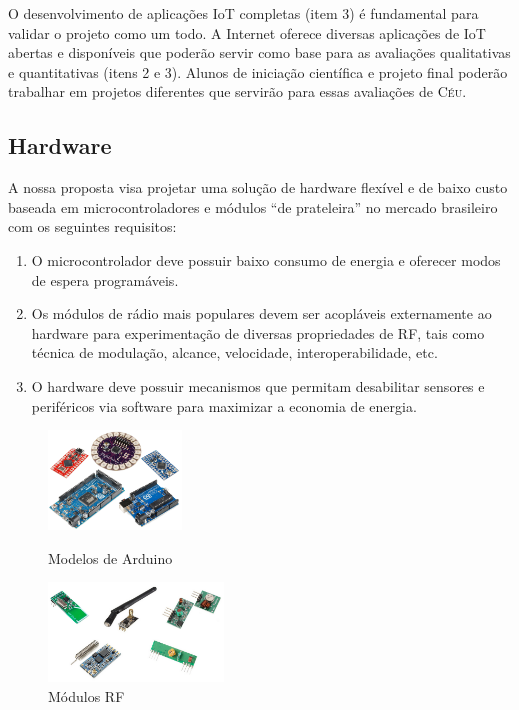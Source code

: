 \documentclass[titlepage,12pt]{article}
\newcommand{\CEU}{\textsc{C\'{e}u}\xspace}
\begin{document}
O desenvolvimento de aplicações IoT completas (item 3) é fundamental para
validar o projeto como um todo.
A Internet oferece diversas aplicações de IoT abertas e disponíveis que poderão
servir como base para as avaliações qualitativas e quantitativas (itens 2 e 3).
Alunos de iniciação científica e projeto final poderão trabalhar em projetos
diferentes que servirão para essas avaliações de \CEU.

\subsection{Hardware}

A nossa proposta visa projetar uma solução de hardware flexível e de baixo
custo baseada em microcontroladores e módulos ``de prateleira'' no mercado
brasileiro com os seguintes requisitos:
%
\begin{enumerate}
\item O microcontrolador deve possuir baixo consumo de energia e oferecer
      modos de espera programáveis.
\item Os módulos de rádio mais populares devem ser acopláveis externamente ao
      hardware para experimentação de diversas propriedades de RF, tais como
      técnica de modulação, alcance, velocidade, interoperabilidade, etc.
\item O hardware deve possuir mecanismos que permitam desabilitar sensores e
      periféricos via software para maximizar a economia de energia.
\end{enumerate}

\begin{figure}
\begin{minipage}{0.50\textwidth}
\includegraphics[height=100px]{arduinos}
\caption{ Modelos de Arduino \label{fig.arduinos} }
\end{minipage}
\begin{minipage}{0.50\textwidth}
\includegraphics[height=100px]{rfs}
\caption{ Módulos RF \label{fig.rfs} }
\end{minipage}
\end{figure}
\end{document}
